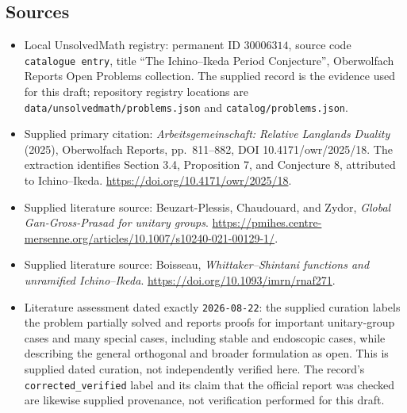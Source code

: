 \documentclass[11pt]{article}
\begin{document}
\subsection{Sources}
\begin{itemize}
\item Local UnsolvedMath registry: permanent ID \(30006314\), source code \texttt{catalogue entry}, title ``The Ichino--Ikeda Period Conjecture'', Oberwolfach Reports Open Problems collection. The supplied record is the evidence used for this draft; repository registry locations are \texttt{data/unsolvedmath/problems.json} and \texttt{catalog/problems.json}.
\item Supplied primary citation: \emph{Arbeitsgemeinschaft: Relative Langlands Duality} (2025), Oberwolfach Reports, pp.\ 811--882, DOI 10.4171/owr/2025/18. The extraction identifies Section 3.4, Proposition 7, and Conjecture 8, attributed to Ichino--Ikeda. \url{https://doi.org/10.4171/owr/2025/18}.
\item Supplied literature source: Beuzart-Plessis, Chaudouard, and Zydor, \emph{Global Gan-Gross-Prasad for unitary groups}. \url{https://pmihes.centre-mersenne.org/articles/10.1007/s10240-021-00129-1/}.
\item Supplied literature source: Boisseau, \emph{Whittaker--Shintani functions and unramified Ichino--Ikeda}. \url{https://doi.org/10.1093/imrn/rnaf271}.
\item Literature assessment dated exactly \texttt{2026-08-22}: the supplied curation labels the problem partially solved and reports proofs for important unitary-group cases and many special cases, including stable and endoscopic cases, while describing the general orthogonal and broader formulation as open. This is supplied dated curation, not independently verified here. The record's \texttt{corrected\_verified} label and its claim that the official report was checked are likewise supplied provenance, not verification performed for this draft.
\end{itemize}
\end{document}
